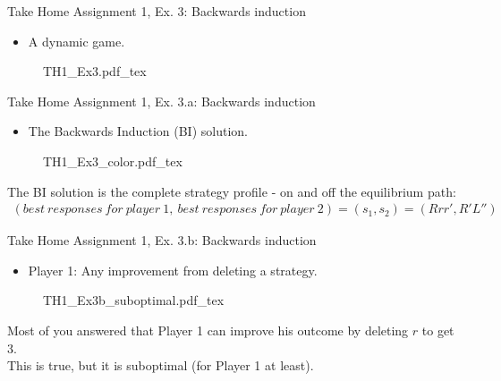\begin{frame}{Take Home Assignment 1, Ex. 3: Backwards induction}
  \begin{itemize}
    \item[3.] A dynamic game.
  \end{itemize}
  \begin{figure}[!h]
    \begin{center}
    \def\svgwidth{\columnwidth}
    {TH1_Ex3.pdf_tex}
    \end{center}
  \end{figure}
\end{frame}
\begin{frame}{Take Home Assignment 1, Ex. 3.a: Backwards induction}
  \begin{itemize}
    \item[(3a)] The Backwards Induction (BI) solution.
  \end{itemize}
  \begin{figure}[!h]
    \begin{center}
    \def\svgwidth{\columnwidth}
    {TH1_Ex3_color.pdf_tex}
    \end{center}
  \end{figure}
  The BI solution is the complete strategy profile - on and off the equilibrium path:
  \begin{align*}
    (best\ responses\ for\ player\ 1,\ best\ responses\ for\ player\ 2)=(s_1,s_2)=(Rrr',R'L'')
  \end{align*}
\end{frame}
\begin{frame}{Take Home Assignment 1, Ex. 3.b: Backwards induction}
  \begin{itemize}
    \item[(3b)] Player 1: Any improvement from deleting a strategy.
  \end{itemize}
  \begin{figure}[!h]
    \begin{center}
    \def\svgwidth{\columnwidth}
    {TH1_Ex3b_suboptimal.pdf_tex}
    \end{center}
  \end{figure}
  Most of you answered that Player 1 can improve his outcome by deleting $r$ to get 3.\\\medskip
  This is true, but it is suboptimal (for Player 1 at least).
\end{frame}
